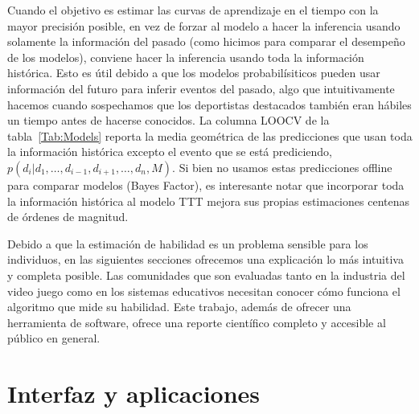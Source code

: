\documentclass[a4paper,11pt]{book}
\theoremstyle{definition}
\begin{document}
Cuando el objetivo es estimar las curvas de aprendizaje en el tiempo con la mayor precisión posible, en vez de forzar al modelo a hacer la inferencia usando solamente la informaci\'on del pasado (como hicimos para comparar el desempeño de los modelos), conviene hacer la inferencia usando toda la información histórica.
%
Esto es útil debido a que los modelos probabilísiticos pueden usar informaci\'on del futuro para inferir eventos del pasado, algo que intuitivamente hacemos cuando sospechamos que los deportistas destacados también eran hábiles un tiempo antes de hacerse conocidos.
%
La columna LOOCV de la tabla~\ref{Tab:Models} reporta la media geométrica de las predicciones que usan toda la informaci\'on hist\'orica excepto el evento que se está prediciendo, $p(d_i| d_1, \dots, d_{i-1}, d_{i+1}, \dots, d_n , M)$.
%
Si bien no usamos estas predicciones offline para comparar modelos (Bayes Factor), es interesante notar que incorporar toda la información histórica al modelo TTT mejora sus propias estimaciones centenas de órdenes de magnitud.

Debido a que la estimación de habilidad es un problema sensible para los individuos, en las siguientes secciones ofrecemos una explicación lo más intuitiva y completa posible.
%
Las comunidades que son evaluadas tanto en la industria del video juego como en los sistemas educativos necesitan conocer c\'omo funciona el algoritmo que mide su habilidad.
%
Este trabajo, además de ofrecer una herramienta de software, ofrece una reporte científico completo y accesible al p\'ublico en general.


\section{Interfaz y aplicaciones} \label{sec:illustrations}
\end{document}
